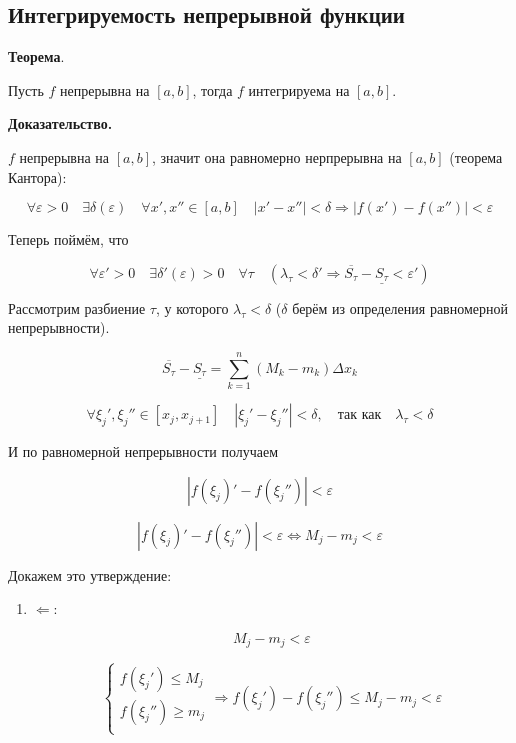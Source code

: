 \documentclass[a4paper]{article}
\begin{document}
\begin{definit}
\hypertarget{p7}{}
\subsection*{Интегрируемость непрерывной функции}

\begin{htheorem}\textbf{Теорема}.

Пусть $f$ непрерывна на $[a,b]$, тогда $f$ интегрируема на $[a,b]$.
\end{htheorem}

\begin{hproof}\textbf{Доказательство.}

$f$ непрерывна на $[a,b]$, значит она равномерно нерпрерывна на $[a,b]$ (теорема Кантора):

\[
\forall \varepsilon > 0 \quad \exists \delta ( \varepsilon ) \quad \forall x', x'' \in [a,b] \quad |x'-x''| < \delta \Rightarrow |f(x') - f(x'')| < \varepsilon
\]

Теперь поймём, что 

\[
\forall \varepsilon' > 0 \quad \exists \delta'(\varepsilon) > 0 \quad \forall \tau \quad (\lambda_\tau < \delta' \Rightarrow \overline{S_\tau} - \underline{S_\tau} < \varepsilon')
\]

Рассмотрим разбиение $\tau$, у которого $\lambda_\tau < \delta$ ($\delta$ берём из определения равномерной непрерывности).

\[
\overline{S_\tau} - \underline{S_\tau} = \sum_{k=1}^n (M_k-m_k) \Delta x_k
\]

\[
\forall \xi_j', \xi_j'' \in [x_j, x_{j+1}] \quad |\xi_j' - \xi_j''| < \delta, \quad \text{так как} \quad \lambda_\tau < \delta
\]

И по равномерной непрерывности получаем

\[
|f(\xi_j)' - f(\xi_j'')| < \varepsilon
\]

\[
|f(\xi_j)' - f(\xi_j'')| < \varepsilon \Leftrightarrow M_j - m_j < \varepsilon
\]

Докажем это утверждение:
\begin{enumerate}
\item $\Leftarrow$:

\[
M_j - m_j < \varepsilon
\]

\[
\begin{cases}
f(\xi_j') \leq M_j \\
f(\xi_j'') \geq m_j \\
\end{cases}
\Rightarrow f(\xi_j') - f(\xi_j'') \leq M_j-m_j < \varepsilon
\]


\end{enumerate}
\end{hproof}
\end{definit}
\end{document}
